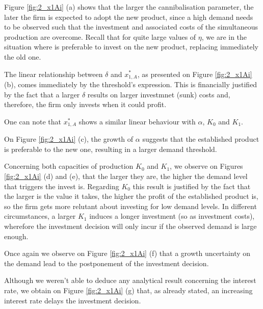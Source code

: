Figure \ref{fig:2_x1Ai} (a) shows that the larger the cannibalisation parameter, the later the firm is expected to adopt the new product, since a high demand needs to be observed such that the investment and associated costs of the simultaneous production are overcome. Recall that for quite large values of $\eta$, we are in the situation where is preferable to invest on the new product, replacing immediately the old one.

The linear relationship between $\delta$ and $x_{1,A}^*$, as presented on Figure \ref{fig:2_x1Ai} (b), comes immediately  by the threshold's expression. This is financially justified by the fact that a larger $\delta$ results on larger investmnet (sunk) costs and, therefore, the firm only invests when it could profit. 

One can note that $x^*_{1,A}$ shows a similar linear behaviour with $\alpha$, $K_0$ and $K_1$. 

On Figure \ref{fig:2_x1Ai} (c), the growth of $\alpha$ suggests that the established product is preferable to the new one, resulting in a larger demand threshold.

Concerning both capacities of production $K_0$ and $K_1$, we observe on Figures \ref{fig:2_x1Ai} (d) and (e), that the larger they are, the higher the demand level that triggers the invest is. Regarding $K_0$ this result is justified by the fact that the larger is the value it takes, the higher the profit of the established product is, so the firm gets more relutant about investing for low demand levels. In different circumstances, a larger $K_1$ induces a longer investment (so as investment costs), wherefore the investment decision will only incur if the observed demand is large enough. 



Once again we observe on Figure \ref{fig:2_x1Ai} (f) that a growth uncertainty on the demand lead to the postponement of the investment decision. 

Although we weren't able to deduce any analytical result concerning the interest rate, we obtain on Figure \ref{fig:2_x1Ai} (g) that, as already stated, an increasing interest rate delays the investment decision.



